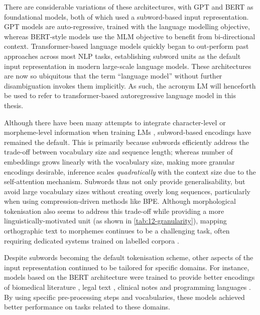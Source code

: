 There are considerable variations of these architectures, with GPT \citep{radford2018gpt1} and BERT \citep{devlin2019bert} as foundational models, both of which used a subword-based input representation. GPT models are auto-regressive, trained with the language modelling objective, whereas BERT-style models use the MLM objective to benefit from bi-directional context. Transformer-based language models quickly began to out-perform past approaches across most NLP tasks, establishing subword units as the default input representation in modern large-scale language models. These architectures are now so ubiquitous that the term ``language model'' without further disambiguation invokes them implicitly. As such, the acronym LM will henceforth be used to refer to transformer-based autoregressive language model in this thesis.

Although there have been many attempts to integrate character-level or morpheme-level information when training LMs \citep[e.g.][]{ma-etal-2020-charbert, nzeyimana-niyongabo-rubungo-2022-kinyabert}, subword-based encodings have remained the default. This is primarily because subwords efficiently address the trade-off between vocabulary size and sequence length; whereas number of embeddings grows linearly with the vocabulary size, making more granular encodings desirable, inference scales \emph{quadratically} with the context size due to the self-attention mechanism. Subwords thus not only provide generalisability, but avoid large vocabulary sizes without creating overly long sequences, particularly when using compression-driven methods like BPE. Although morphological tokenisation also seems to address this trade-off while providing a more linguistically-motivated unit (as shown in \cref{tab:12-granularity}), mapping orthographic text to morphemes continues to be a challenging task, often requiring dedicated systems trained on labelled corpora \citep{batsuren-etal-2022-sigmorphon}. 

Despite subwords becoming the default tokenisation scheme, other aspects of the input representation continued to be tailored for specific domains. For instance, models based on the BERT architecture were trained to provide better encodings of biomedical literature \citep[BioBERT;][]{lee2020biobert}, legal text \citep[LEGAL-BERT;][]{chalkidis2020legal}, clinical notes \citep[Clinical BERT;][]{alsentzer2019publicly} and programming languages \citep[CodeBERT;][]{feng-etal-2020-codebert}. By using specific pre-processing steps and vocabularies, these models achieved better performance on tasks related to these domains.

